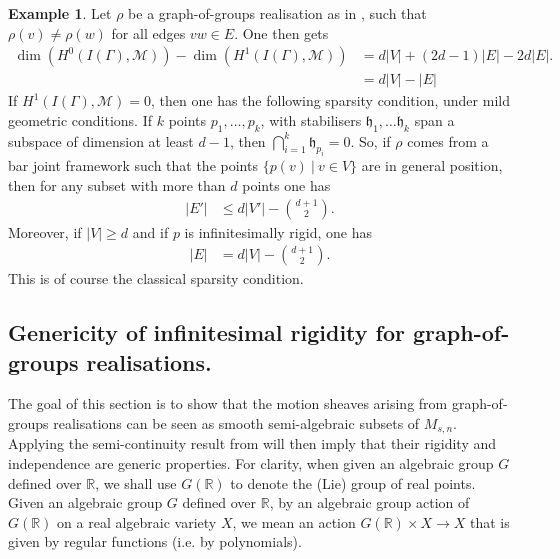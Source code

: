 \documentclass{article}
\theoremstyle{definition}
\newtheorem{example}[theorem]{Example}
\theoremstyle{remark}
\begin{document}
\begin{example}\label{ex: Se(d) Maxwell}
    Let $\rho$ be a graph-of-groups realisation as in , such that $\rho(v)\neq \rho(w)$ for all edges $vw\in E$. One then gets
    \begin{align*}
        \dim(H^{0}(I(\Gamma), \mathcal{M})) - \dim(H^{1}(I(\Gamma), \mathcal{M})) & = d |V| +(2d-1)|E|- 2d |E|.\\
        &= d|V| -|E|
    \end{align*}
If $H^{1}(I(\Gamma), \mathcal{M})= 0$, then one has the following sparsity condition, under mild geometric conditions. If $k$ points $p_1, \dots, p_k$, with stabilisers $\mathfrak{h}_1,\dots \mathfrak{h}_k$ span a subspace of dimension at least $d-1$, then $\bigcap_{i=1}^{k} \mathfrak{h}_{p_i}= 0$. So, if $\rho$ comes from a bar joint framework such that the points $\{p(v)~\vert~v\in V\}$ are in general position, then for any subset with more than $d$ points one has 
        \begin{align*}
        |E'| &\leq d|V'| -\binom{d+1}{2}.
        \end{align*}
        Moreover, if $|V|\geq d$ and if $p$ is infinitesimally rigid, one has 
        \begin{align*}
        |E| &= d|V| -\binom{d+1}{2}.
        \end{align*}
    This is of course the classical sparsity condition. 
\end{example}


\subsection{Genericity of infinitesimal rigidity for graph-of-groups realisations.}\label{sec: genericity for graph of groups realisations}
The goal of this section is to show that the motion sheaves arising from graph-of-groups realisations can be seen as smooth semi-algebraic subsets of $M_{s, n}$. Applying the semi-continuity result from  will then imply that their rigidity and independence are generic properties. For clarity, when given an algebraic group $G$ defined over $\mathbb{R}$, we shall use $G(\mathbb{R})$ to denote the (Lie) group of real points. Given an algebraic group $G$ defined over $\mathbb{R}$, by an algebraic group action of $G(\mathbb{R})$ on a real algebraic variety $X$, we mean an action $G(\mathbb{R}) \times X \rightarrow X$ that is given by regular functions (i.e. by polynomials).
\end{document}
